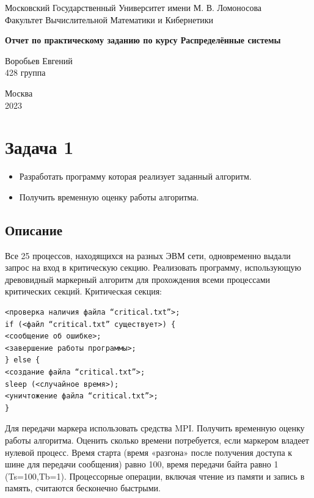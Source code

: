 \documentclass[a4paper,12pt,titlepage,final]{article}
\begin{document}
\begin{titlepage}
    \begin{center}
    {\small \sc Московский Государственный Университет имени М. В. Ломоносова \\
    Факультет Вычислительной Математики и Кибернетики\\}
    \vfill
    
    {\large \bf Отчет по практическому заданию по курсу Распределённые системы\\}
    \end{center}
    \begin{flushright}
    \vfill {
    Воробьев Евгений\\
    428 группа\\
    }
    \end{flushright}
    \begin{center}
    \vfill
    {\small Москва\\2023}
    \end{center}
    \par
\end{titlepage}

\tableofcontents

\newpage
\section{Задача 1}
\begin{itemize}
\item Разработать программу которая реализует заданный алгоритм. 
\item Получить временную оценку работы алгоритма.
\end{itemize}

\subsection{Описание}\par
Все 25 процессов, находящихся на разных ЭВМ сети, одновременно выдали запрос на вход в критическую секцию. Реализовать программу, использующую древовидный маркерный алгоритм для прохождения всеми процессами критических секций.
Критическая секция:
\begin{verbatim}
<проверка наличия файла “critical.txt”>;
if (<файл “critical.txt” существует>) {
<сообщение об ошибке>;
<завершение работы программы>;
} else {
<создание файла “critical.txt”>;
sleep (<случайное время>);
<уничтожение файла “critical.txt”>;
}    
\end{verbatim}
Для передачи маркера использовать средства MPI.
Получить временную оценку работы алгоритма. Оценить сколько времени потребуется, если маркером владеет нулевой процесс. Время старта (время «разгона» после получения доступа к шине для передачи сообщения) равно 100, время передачи байта равно 1 (Ts=100,Tb=1). Процессорные операции, включая чтение из памяти и запись в память, считаются бесконечно быстрыми.
\end{document}
